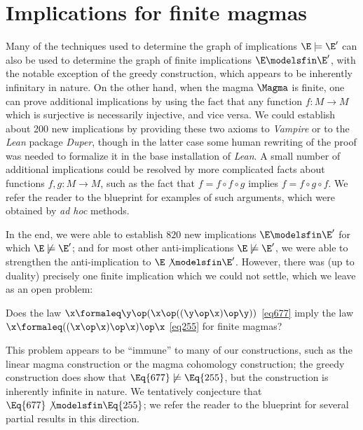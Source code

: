 \section{Implications for finite magmas}\label{austin-sec}

Many of the techniques used to determine the graph of implications $\E \models \E'$ can also be used to determine the graph of finite implications $\E \modelsfin \E'$, with the notable exception of the greedy construction, which appears to be inherently infinitary in nature.  On the other hand, when the magma $\Magma$ is finite, one can prove additional implications by using the fact that any function $f \colon M \to M$ which is surjective is necessarily injective, and vice versa.  We could establish about 200 new implications by providing these two axioms to \emph{Vampire} or to the \emph{Lean} package \emph{Duper}, though in the latter case some human rewriting of the proof was needed to formalize it in the base installation of \emph{Lean}.  A small number of additional implications could be resolved by more complicated facts about functions $f,g \colon M \to M$, such as the fact that $f = f \circ f \circ g$ implies $f = f \circ g \circ f$.  We refer the reader to the blueprint for examples of such arguments, which were obtained by \emph{ad hoc} methods.

In the end, we were able to establish $820$ new implications $\E \modelsfin \E'$ for which $\E \not \models \E'$; and for most other anti-implications $\E \not \models \E'$, we were able to strengthen the anti-implication to $\E \not \modelsfin \E'$.  However, there was (up to duality) precisely one finite implication which we could not settle, which we leave as an open problem:

\begin{problem}  Does the law $\x \formaleq \y \op (\x \op ((\y \op \x) \op \y))$ \eqref{eq677} imply the law $\x \formaleq ((\x \op \x) \op \x) \op \x$ \eqref{eq255} for finite magmas?
\end{problem}

This problem appears to be ``immune'' to many of our constructions, such as the linear magma construction or the magma cohomology construction; the greedy construction does show that $\Eq{677} \not \models \Eq{255}$, but the construction is inherently infinite in nature.  We tentatively conjecture that $\Eq{677} \not \modelsfin \Eq{255}$; we refer the reader to the blueprint for several partial results in this direction.

